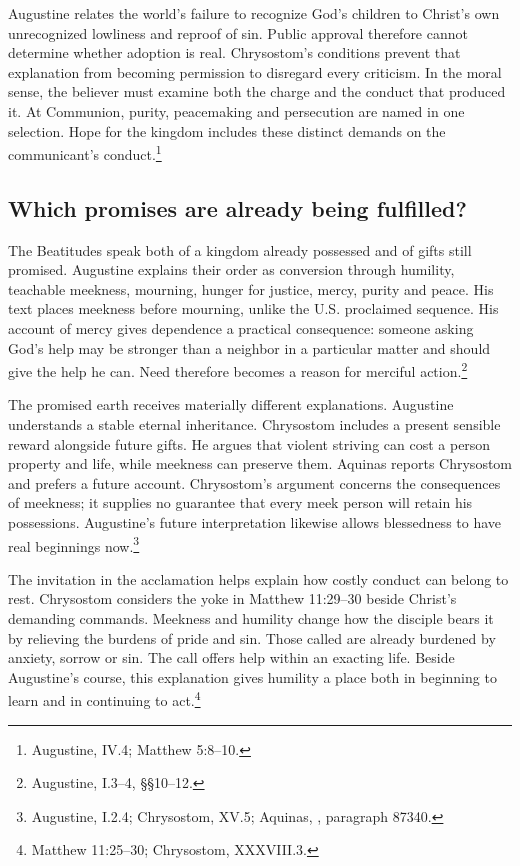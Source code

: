 Augustine relates the world's failure to recognize God's children to Christ's own unrecognized lowliness and reproof of sin. Public approval therefore cannot determine whether adoption is real. Chrysostom's conditions prevent that explanation from becoming permission to disregard every criticism. In the moral sense, the believer must examine both the charge and the conduct that produced it. At Communion, purity, peacemaking and persecution are named in one selection. Hope for the kingdom includes these distinct demands on the communicant's conduct.\footnote{Augustine,  IV.4; Matthew 5:8--10.}

\subsection{Which promises are already being fulfilled?}
The Beatitudes speak both of a kingdom already possessed and of gifts still promised. Augustine explains their order as conversion through humility, teachable meekness, mourning, hunger for justice, mercy, purity and peace. His text places meekness before mourning, unlike the U.S. proclaimed sequence. His account of mercy gives dependence a practical consequence: someone asking God's help may be stronger than a neighbor in a particular matter and should give the help he can. Need therefore becomes a reason for merciful action.\footnote{Augustine,  I.3--4, §§10--12.}

The promised earth receives materially different explanations. Augustine understands a stable eternal inheritance. Chrysostom includes a present sensible reward alongside future gifts. He argues that violent striving can cost a person property and life, while meekness can preserve them. Aquinas reports Chrysostom and prefers a future account. Chrysostom's argument concerns the consequences of meekness; it supplies no guarantee that every meek person will retain his possessions. Augustine's future interpretation likewise allows blessedness to have real beginnings now.\footnote{Augustine,  I.2.4; Chrysostom,  XV.5; Aquinas, , paragraph 87340.}

The invitation in the acclamation helps explain how costly conduct can belong to rest. Chrysostom considers the yoke in Matthew 11:29--30 beside Christ's demanding commands. Meekness and humility change how the disciple bears it by relieving the burdens of pride and sin. Those called are already burdened by anxiety, sorrow or sin. The call offers help within an exacting life. Beside Augustine's course, this explanation gives humility a place both in beginning to learn and in continuing to act.\footnote{Matthew 11:25--30; Chrysostom,  XXXVIII.3.}

